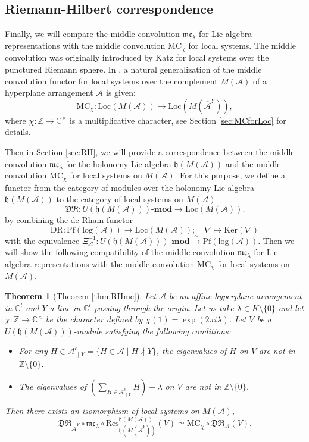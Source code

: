 \documentclass[a4paper,12pt]{article}
\newcommand{\C}{\mathbb{C}}
\newtheorem{thm}{Theorem}[section]
\theoremstyle{definition}
\theoremstyle{remark}
\begin{document}
\subsection{Riemann-Hilbert correspondence}
Finally, we will compare the middle convolution $\mathfrak{mc}_{\lambda}$ for
Lie algebra representations with the middle convolution $\mathrm{MC}_{\chi}$ for local systems.
The middle convolution 
was originally introduced by Katz \cite{Katz} for 
local systems over the punctured Riemann sphere.
In \cite{AdaHir}, a natural generalization of the middle convolution 
functor for local systems over the complement $M(\mathcal{A})$ 
of a hyperplane arrangement $\mathcal{A}$ is given:
\[
	\mathrm{MC}_{\chi}\colon \mathrm{Loc}(M(\mathcal{A}))\to \mathrm{Loc}(M(\overline{\mathcal{A}}^{Y})),
\]
where $\chi\colon \mathbb{Z}\to \mathbb{C}^{\times}$ is a multiplicative 
character, see Section \ref{sec:MCforLoc} for details.

Then in Section \ref{sec:RH},
we will provide a correspondence between the middle convolution 
$\mathfrak{mc}_{\lambda}$
for the holonomy Lie algebra $\mathfrak{h}(M(\mathcal{A}))$
and the middle convolution $\mathrm{MC}_{\chi}$ for local systems 
on $M(\mathcal{A})$.
For this purpose, 
we define a functor from 
the category of modules over the holonomy Lie algebra 
$\mathfrak{h}(M(\mathcal{A}))$ to the category of local systems 
on $M(\mathcal{A})$
\[
	\mathfrak{DR}\colon U(\mathfrak{h}(M(\mathcal{A})))\text{-}\mathbf{mod}\to \mathrm{Loc}(M(\mathcal{A})).
\]
by combining the de Rham functor 
\[
\mathrm{DR}\colon \mathrm{Pf}(\mathrm{log}(\mathcal{A}))\to \mathrm{Loc}(M(\mathcal{A})); \quad \nabla \mapsto \mathrm{Ker}(\nabla)
\]
with the equivalence $\Xi_{\mathcal{A}}^{-1}\colon U(\mathfrak{h}(M(\mathcal{A})))\text{-}\mathbf{mod}
\xrightarrow{\simeq} \mathrm{Pf}(\mathrm{log}(\mathcal{A}))$.
Then we will show the following compatibility of the middle convolution
$\mathfrak{mc}_{\lambda}$ for Lie algebra representations 
with the middle convolution $\mathrm{MC}_{\chi}$ for local systems 
on $M(\mathcal{A})$.
\begin{thm}[Theorem \ref{thm:RHmc}]
	Let $\mathcal{A}$ be an affine hyperplane arrangement in $\C^{l}$ and $Y$ a line in $\C^{l}$ passing through the origin.
	Let us take $\lambda\in K\setminus\{0\}$ and let $\chi\colon \mathbb{Z}\to \mathbb{C}^{\times}$ be the character defined by $\chi(1)=\exp(2\pi i\lambda)$. 
	Let $V$ be a $U(\mathfrak{h}(M(\mathcal{A})))$-module satisfying the following conditions:
	\begin{itemize}
		\item For any $H\in \mathcal{A}_{\parallel Y}^{c}=\{H\in \mathcal{A}\mid H\not\parallel Y\}$, the eigenvalues of $H$ on $V$ are not in $\mathbb{Z}\setminus\{0\}$.
		\item The eigenvalues of $\left(\sum_{H\in \mathcal{A}_{\parallel Y}^{c}}H\right)+\lambda$ on $V$ are not in $\mathbb{Z}\setminus\{0\}$. 
	\end{itemize}
Then there exists an isomorphism of local systems on $M(\mathcal{A})$,
\[
	\mathfrak{DR}_{\overline{\mathcal{A}}^{Y}}\circ \mathfrak{mc}_{\lambda}\circ \mathrm{Res}_{\mathfrak{h}(M(\overline{\mathcal{A}}^{Y}))}^{\mathfrak{h}(M(\mathcal{A}))}(V)\simeq \mathrm{MC}_{\chi}\circ\mathfrak{DR}_{\mathcal{A}}(V).
\]
\end{thm}
\end{document}
